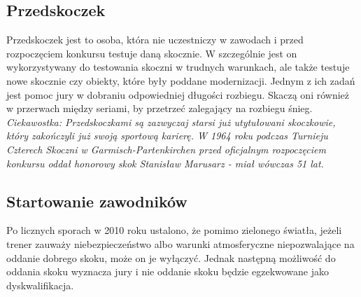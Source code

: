 \documentclass[11pt]{article}
\begin{document}
\subsection{Przedskoczek}
Przedskoczek jest to osoba, która nie uczestniczy w zawodach i przed rozpoczęciem konkursu testuje daną skocznie. W szczególnie jest on wykorzystywany do testowania skoczni w trudnych warunkach, ale także testuje nowe skocznie czy obiekty, które były poddane modernizacji. Jednym z ich zadań jest pomoc jury w dobraniu odpowiedniej długości rozbiegu. Skaczą oni również w przerwach między seriami, by przetrzeć zalegający na rozbiegu śnieg.
\newline 
\newline \textit{{\small Ciekawostka: Przedskoczkami są zazwyczaj starsi już utytułowani skoczkowie, który zakończyli już swoją sportową karierę. W 1964 roku podczas Turnieju Czterech Skoczni w Garmisch-Partenkirchen przed oficjalnym rozpoczęciem konkursu oddał honorowy skok Stanisław Marusarz - miał wówczas 51 lat. }}
\subsection{Startowanie zawodników}
Po licznych sporach w 2010 roku ustalono, że pomimo zielonego światła, jeżeli trener zauważy niebezpieczeństwo albo warunki atmosferyczne niepozwalające na oddanie dobrego skoku, może on je wyłączyć. Jednak następną możliwość do oddania skoku wyznacza jury i nie oddanie skoku będzie egzekwowane jako dyskwalifikacja.
\newpage
\end{document}
